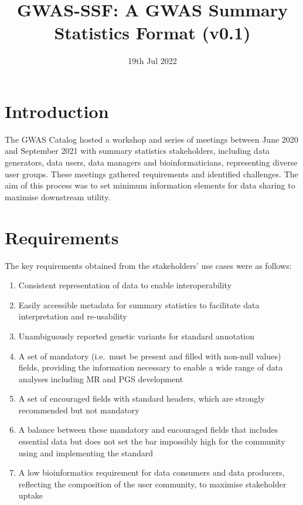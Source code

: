\documentclass[11pt]{article}
\title{GWAS-SSF: A GWAS Summary Statistics Format (v0.1)}
\date{19th Jul 2022}
\begin{document}
\maketitle

\newpage
\tableofcontents

\newpage

\section{Introduction}
The GWAS Catalog hosted a workshop and series of meetings between June 2020 and September 2021 with summary statistics stakeholders, including data generators, data users, data managers and bioinformaticians, representing diverse user groups. These meetings gathered requirements and identified challenges. The aim of this process was to set minimum information elements for data sharing to maximise downstream utility.

\section{Requirements}

The key requirements obtained from the stakeholders’ use cases were as follows:

\begin{enumerate}
\item Consistent representation of data to enable interoperability
\item Easily accessible metadata for summary statistics to facilitate data interpretation and re-usability
\item Unambiguously reported genetic variants for standard annotation
\item A set of mandatory (i.e.\ must be present and filled with non-null values) fields, providing the information necessary to enable a wide range of data analyses including MR and PGS development
\item A set of encouraged fields with standard headers, which are strongly recommended but not mandatory 
\item A balance between these mandatory and encouraged fields that includes essential data but does not set the bar impossibly high for the community using and implementing the standard
\item A low bioinformatics requirement for data consumers and data producers, reflecting the composition of the user community, to maximise stakeholder uptake 
\end{enumerate}
\end{document}

